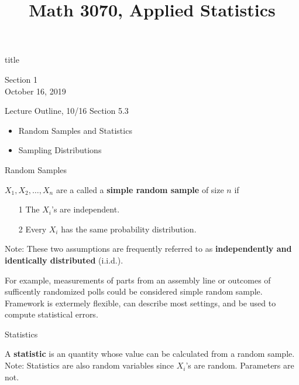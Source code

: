 \documentclass[t]{beamer}
\title{Math 3070, Applied Statistics}
\newcommand{\nl}[1]{\vspace{#1 em}}
\begin{document}
\begin{frame}[c]
    \begin{beamercolorbox}[rounded=true,wd=\textwidth,center]{title}
        \inserttitle
    \end{beamercolorbox}
    \begin{center}
        Section 1\\
        \nl{0.5}
        October 16, 2019
    \end{center}
\end{frame}
\begin{frame}[c]{Lecture Outline, 10/16}
    Section 5.3
    \begin{itemize}
        \item Random Samples and Statistics
        \item Sampling Distributions
    \end{itemize}
\end{frame}
\begin{frame}{Random Samples}
    \begin{block}{}
        $X_1, X_2, \ldots, X_n$ are a called a \textbf{simple random sample} of size $n$ if
        \begin{itemize}
            \item[1] The $X_i$'s are independent.
            \item[2] Every $X_i$ has the same probability distribution.
    \end{itemize}
    Note: These two assumptions are frequently referred to as \textbf{independently and identically distributed} (i.i.d.).
    \end{block}
    For example, measurements of parts from an assembly line or outcomes of sufficently randomized polls could be considered simple random sample. Framework is extermely flexible, can describe most settings, and be used to compute statistical errors.
\end{frame}
\begin{frame}{Statistics}
    \begin{block}{}
        A \textbf{statistic} is an quantity whose value can be calculated from a random sample.\\
        \nl{0.5}
        Note: Statistics are also random variables since $X_i$'s are random. Parameters are not.
    \end{block}
\end{frame}
\end{document}
